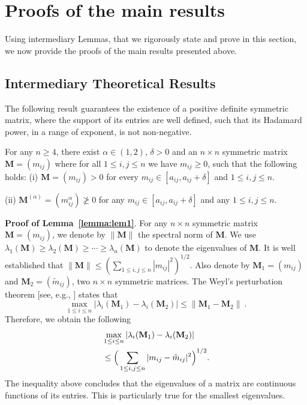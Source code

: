 \documentclass[conference,letterpaper]{IEEEtran}
\numberwithin{equation}{section}
\newcommand{\lbl}{\label}
\newcommand{\bea}{\begin{eqnarray}}
\newcommand{\eea}{\end{eqnarray}}
\begin{document}
\section{Proofs of the main results}\lbl{sec:proofs}
Using intermediary Lemmas, that we rigorously state and prove in this section, we now provide the proofs of the main results presented above.

\subsection{Intermediary Theoretical Results}
The following result guarantees the existence of a positive definite symmetric matrix, where the support of its entries are well defined, such that its Hadamard power, in a range of exponent, is not non-negative.
\begin{lem}\lbl{lemma:lem1} For any $n\geq 4$, there exist $\alpha\in (1,2)$, $\delta>0$ and an $n\times n$ symmetric matrix $\mathbf{M}=(m_{ij})$ where for all $1\leq i, j \leq n$ we have $m_{ij}\geq 0$, such that the following holds:
(i) $\mathbf{M}=(m_{ij})>0$  for every $m_{ij}\in [a_{ij}, a_{ij}+\delta]$ and $1\leq i, j \leq n.$

(ii) $\mathbf{M}^{(\alpha)}=(m_{ij}^{\alpha})\ngeqslant 0$  for any $m_{ij}\in [a_{ij}, a_{ij}+\delta]$ and any $1\leq i, j \leq n.$
\end{lem}
\medskip
\noindent\textbf{Proof of Lemma~\ref{lemma:lem1}}. For any $n\times n$ symmetric matrix $\mathbf{M}=(m_{ij})$, we denote by $\|\mathbf{M}\|$ the spectral norm of $\mathbf{M}$. 
We use $\lambda_1(\mathbf{M})\geq \lambda_2(\mathbf{M})\geq \cdots \geq \lambda_n(\mathbf{M})$ to denote  the eigenvalues of $\mathbf{M}$.  
It is well established that $\|\mathbf{M}\|\leq (\sum_{1\leq i, j \leq n}|m_{ij}|^2)^{1/2}$. 
Also denote by $\mathbf{M}_1=(m_{ij})$ and $\mathbf{M}_2=(\tilde{m}_{ij})$, two $n\times n$ symmetric matrices. 
The Weyl's perturbation theorem [see, e.g., \cite{horn1985}] states that
$$\max_{1\leq i \leq n}|\lambda_i(\mathbf{M}_1)-\lambda_i(\mathbf{M}_2)|\leq \|\mathbf{M}_1-\mathbf{M}_2\| \ .$$  
Therefore, we obtain the following
\bea
& \max_{1\leq i \leq n}|\lambda_i(\mathbf{M}_1)-\lambda_i(\mathbf{M}_2)|\\\notag
&\leq \Big(\sum_{1\leq i, j \leq n}|m_{ij}-\tilde{m}_{ij}|^2\Big)^{1/2}.\lbl{flower_could}
\eea
The inequality above concludes that the eigenvalues of a matrix are continuous functions of its entries. 
This is particularly true for the smallest eigenvalues.
\end{document}
